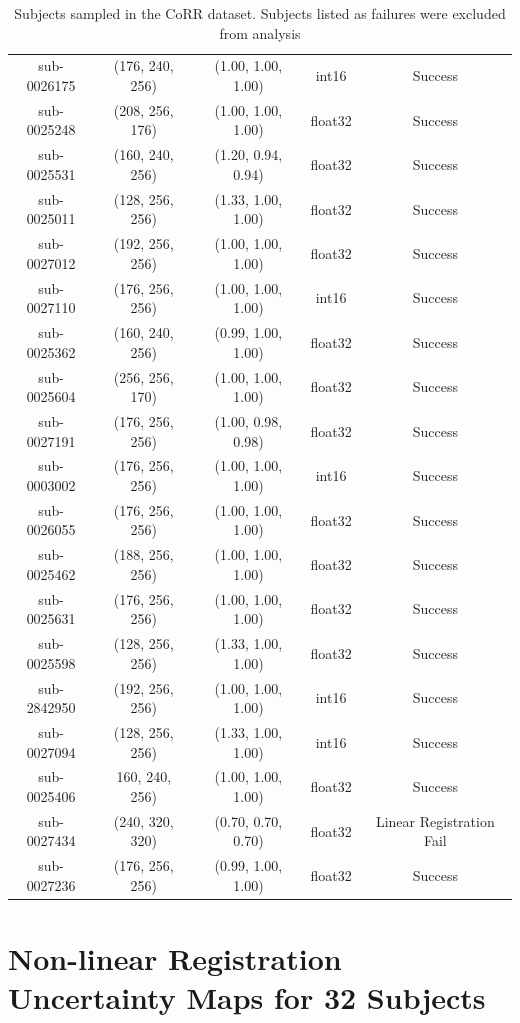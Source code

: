 \begin{table}[ht!]
\begin{tabular}{|c c c c c|}
sub-0026175 & (176, 240, 256) & (1.00, 1.00, 1.00) & int16 & Success \\
sub-0025248 & (208, 256, 176) & (1.00, 1.00, 1.00) & float32 & Success \\
sub-0025531 & (160, 240, 256) & (1.20, 0.94, 0.94) & float32 & Success \\
sub-0025011 & (128, 256, 256) & (1.33, 1.00, 1.00) & float32 & Success \\
sub-0027012 & (192, 256, 256) & (1.00, 1.00, 1.00) & float32 & Success \\
sub-0027110 & (176, 256, 256) & (1.00, 1.00, 1.00) & int16 & Success \\
sub-0025362 & (160, 240, 256) & (0.99, 1.00, 1.00) & float32 & Success \\
sub-0025604 & (256, 256, 170) & (1.00, 1.00, 1.00) & float32 & Success \\
sub-0027191 & (176, 256, 256) & (1.00, 0.98, 0.98) & float32 & Success \\
sub-0003002 & (176, 256, 256) & (1.00, 1.00, 1.00) & int16 & Success \\
sub-0026055 & (176, 256, 256) & (1.00, 1.00, 1.00) & float32 & Success \\
sub-0025462 & (188, 256, 256) & (1.00, 1.00, 1.00) & float32 & Success \\
sub-0025631 & (176, 256, 256) & (1.00, 1.00, 1.00) & float32 & Success \\
sub-0025598 & (128, 256, 256) & (1.33, 1.00, 1.00) & float32 & Success \\
sub-2842950 & (192, 256, 256) & (1.00, 1.00, 1.00) & int16 & Success \\
sub-0027094 & (128, 256, 256) & (1.33, 1.00, 1.00) & int16 & Success \\
sub-0025406 & 160, 240, 256) & (1.00, 1.00, 1.00) & float32 & Success \\
sub-0027434 & (240, 320, 320) & (0.70, 0.70, 0.70) & float32 & Linear Registration Fail \\
sub-0027236 & (176, 256, 256) & (0.99, 1.00, 1.00) & float32 & Success \\
 \hline
\end{tabular}
\caption{Subjects sampled in the CoRR dataset. Subjects listed as failures were excluded from analysis}
\label{table:corr_subjects}
\end{table}

\section{Non-linear Registration Uncertainty Maps for 32 Subjects}
\label{appendix:non-linear-registration}

